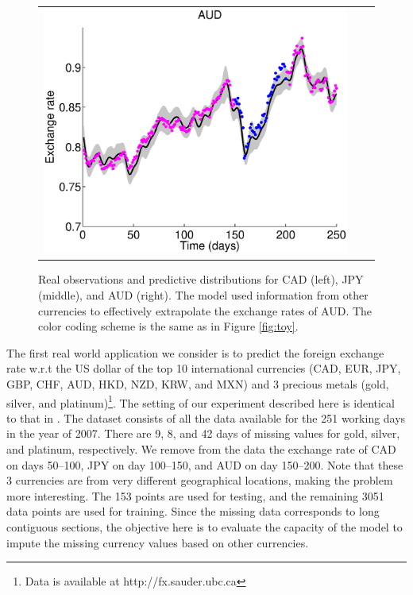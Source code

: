 \begin{figure}
\begin{tabular}{ccc}
\includegraphics[scale=0.28]{figures/fxAUD.eps}
\end{tabular}
\caption{Real observations and predictive distributions for CAD (left), JPY (middle), and AUD (right). The model used  information from other currencies to effectively extrapolate the exchange rates of AUD. The color coding scheme is the same as in Figure \ref{fig:toy}.}
\label{fig:fx}
\end{figure}

The first real world application we consider is to predict the foreign exchange rate w.r.t the US dollar of the top 10 international currencies (CAD, EUR, JPY, GBP, CHF, AUD, HKD, NZD, KRW, and MXN) and 3 precious metals (gold, silver, and platinum)\footnote{Data is available at http://fx.sauder.ubc.ca}. 
The setting of our experiment described here is identical to that in \citet{alvarez2010efficient}.
The dataset consists of all the data available for the 251 working days in the year of 2007.
There are 9, 8, and 42 days of missing values  for gold, silver, and platinum, respectively.
We remove from the data the exchange rate of CAD on days 50--100, JPY on day 100--150, and AUD on day 150--200.
Note that these 3 currencies are from very different geographical locations, making the problem more interesting. 
The 153 points are used for testing, and the remaining 3051 data points are used for training.
Since the missing data corresponds to long contiguous sections, the objective here is to evaluate the capacity of the model to impute the missing currency values based on other currencies.

